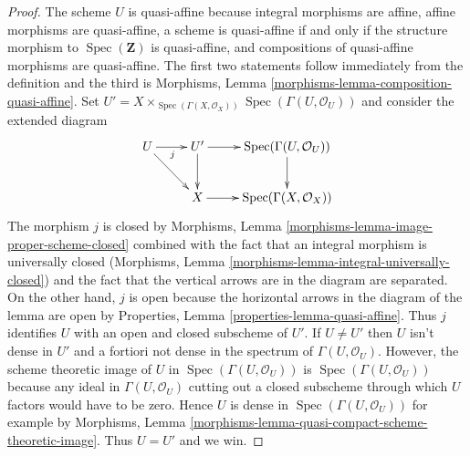 \documentclass[10pt,a4paper]{amsart}
\theoremstyle{plain}
\theoremstyle{definition}
\theoremstyle{remark}
\numberwithin{equation}{subsection}
\def\Spec{\mathop{\mathrm{Spec}}}
\begin{document}
\begin{proof}
The scheme $U$ is quasi-affine because integral morphisms are affine,
affine morphisms are quasi-affine, a scheme is quasi-affine if and only if
the structure morphism to $\Spec(\mathbf{Z})$ is quasi-affine, and
compositions of quasi-affine morphisms are quasi-affine.
The first two statements follow immediately from the definition
and the third is
Morphisms, Lemma \ref{morphisms-lemma-composition-quasi-affine}.
Set $U' =
X \times_{\Spec(\Gamma(X, \mathcal{O}_X))} \Spec(\Gamma(U, \mathcal{O}_U))$
and consider the extended diagram
$$
\xymatrix{
U \ar[r]_j \ar[rd] & U' \ar[d] \ar[r] &
\Spec(\Gamma(U, \mathcal{O}_U)) \ar[d] \\
& X \ar[r] & \Spec(\Gamma(X, \mathcal{O}_X))
}
$$
The morphism $j$ is closed by
Morphisms, Lemma \ref{morphisms-lemma-image-proper-scheme-closed}
combined with the fact that an integral morphism is universally closed
(Morphisms, Lemma \ref{morphisms-lemma-integral-universally-closed})
and the fact that the vertical arrows are in the diagram are separated.
On the other hand, $j$ is open because the horizontal
arrows in the diagram of the lemma are open by
Properties, Lemma \ref{properties-lemma-quasi-affine}.
Thus $j$ identifies $U$ with an open and closed subscheme of $U'$.
If $U \not = U'$ then $U$ isn't dense in $U'$ and a fortiori
not dense in the spectrum of $\Gamma(U, \mathcal{O}_U)$.
However, the scheme theoretic image of
$U$ in $\Spec(\Gamma(U, \mathcal{O}_U))$ is $\Spec(\Gamma(U, \mathcal{O}_U))$
because any ideal in $\Gamma(U, \mathcal{O}_U)$
cutting out a closed subscheme through which $U$
factors would have to be zero.
Hence $U$ is dense in $\Spec(\Gamma(U, \mathcal{O}_U))$ for example by
Morphisms, Lemma \ref{morphisms-lemma-quasi-compact-scheme-theoretic-image}.
Thus $U = U'$ and we win.
\end{proof}
\end{document}
